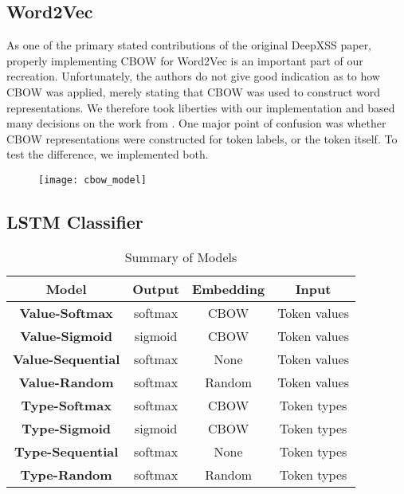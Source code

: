 \subsection{Word2Vec}

As one of the primary stated contributions of the original DeepXSS \cite{fang2018deepxss} paper, properly implementing CBOW for Word2Vec is an important part of our recreation. Unfortunately, the authors do not give good indication as to how CBOW was applied, merely stating that CBOW was used to construct word representations.  We therefore took liberties with our implementation and based many decisions on the work from \cite{afzal2021deeplearning}.  One major point of confusion was whether CBOW representations were constructed for token labels, or the token itself.  To test the difference, we implemented both.

\begin{figure}[H]
	\texttt{[image: cbow\_model]}
\end{figure}




\subsection{LSTM Classifier}

\begin{table}
\begin{center}
\begingroup
\setlength{\tabcolsep}{6pt} %
\renewcommand{\arraystretch}{1.5} %
\begin{tabular}{|| c | c | c | c ||} 
    \hline
    Model & Output & Embedding & Input \\ 
    \hline\hline
    \textbf{Value-Softmax} & softmax & CBOW & Token values \\
    \hline
    \textbf{Value-Sigmoid} &  sigmoid & CBOW & Token values \\ 
    \hline
    \textbf{Value-Sequential} & softmax & None & Token values \\
    \hline
    \textbf{Value-Random} & softmax & Random & Token values \\
    \hline
    \textbf{Type-Softmax} & softmax & CBOW & Token types \\
    \hline
    \textbf{Type-Sigmoid} & sigmoid & CBOW & Token types \\
    \hline
    \textbf{Type-Sequential} & softmax & None & Token types \\
    \hline
    \textbf{Type-Random} & softmax & Random & Token types \\
    \hline
\end{tabular}
\endgroup
\caption{\label{model-sum}Summary of Models}
\end{center}
\end{table}
